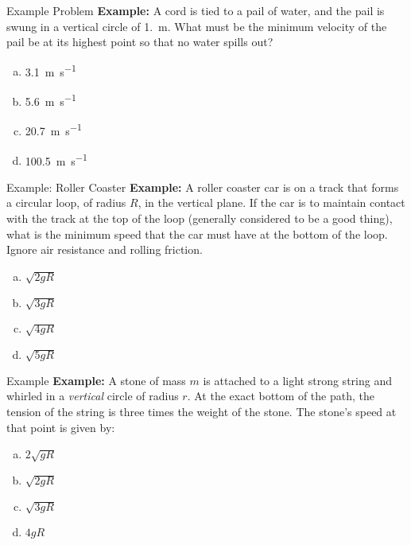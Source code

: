 \documentclass[12pt,compress,aspectratio=169]{beamer}
\begin{document}
\begin{frame}{Example Problem}
  \textbf{Example:} A cord is tied to a pail of water, and the pail is swung
  in a vertical circle of \SI{1.}{\metre}. What must be the minimum velocity of
  the pail be at its highest point so that no water spills out?

  \begin{enumerate}[(a)]
  \item\SI{3.1}{\metre\per\second}
  \item\SI{5.6}{\metre\per\second}
  \item\SI{20.7}{\metre\per\second}
  \item\SI{100.5}{\metre\per\second}
  \end{enumerate}
\end{frame}



\begin{frame}{Example: Roller Coaster}
  \textbf{Example:} A roller coaster car is on a track that forms a circular
  loop, of radius $R$, in the vertical plane. If the car is to maintain contact
  with the track at the top of the loop (generally considered to be a good
  thing), what is the minimum speed that the car must have at the bottom of the
  loop. Ignore air resistance and rolling friction.
  \begin{enumerate}[(a)]
  \item $\sqrt{2gR}$
  \item $\sqrt{3gR}$
  \item $\sqrt{4gR}$
  \item $\sqrt{5gR}$
  \end{enumerate}
\end{frame}



\begin{frame}{Example}
  \textbf{Example:} A stone of mass $m$ is attached to a light strong string
  and whirled in a \emph{vertical} circle of radius $r$. At the exact bottom of
  the path, the tension of the string is three times the weight of the stone.
  The stone's speed at that point is given by:
  \begin{enumerate}[(a)]
  \item $2\sqrt{gR}$
  \item $\sqrt{2gR}$
  \item $\sqrt{3gR}$
  \item $4gR$
  \end{enumerate}
\end{frame}
\end{document}

